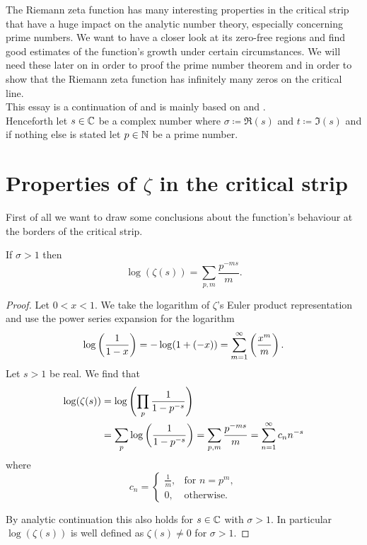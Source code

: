 The Riemann zeta function has many interesting properties in the critical strip that have a huge impact on the analytic number theory, especially concerning prime numbers. We want to have a closer look at its zero-free regions and find good estimates of the function's growth under certain circumstances. We will need these later on in order to proof the prime number theorem and in order to show that the Riemann zeta function has infinitely many zeros on the critical line. \\
This essay is a continuation of \cite{Jesacher2016} and is mainly based on \cite{Ahlfors1966} and \cite{Titchmarsh1986}. \\
Henceforth let $s \in \mathbb{C}$ be a complex number where $\sigma \coloneqq \Re(s)$ and $t \coloneqq \Im(s)$ and if nothing else is stated let $p \in \mathbb{N}$ be a prime number.


\section{Properties of $\zeta$ in the critical strip}
First of all we want to draw some conclusions about the function's behaviour at the borders of the critical strip.


\begin{lemma}\label{lem:LogEulerProd}
	If $\sigma > 1$ then
\begin{equation*}
	\log(\zeta(s)) = \sum _{p,m} \frac{p^{-ms}}{m}.
\end{equation*}
\end{lemma}
\begin{proof}
	Let $0 < x < 1$. We take the logarithm of $\zeta$'s Euler product representation and use the power series expansion for the logarithm
\begin{equation*}
	\log\left(\frac{1}{1 - x}\right) = -\log(1 + (-x)) = \sum _{m = 1} ^\infty \left(\frac{x^m}{m}\right).
\end{equation*}
	Let $s > 1$ be real. We find that
\begin{equation*}
\begin{aligned}	
	\log(\zeta(s)) 
		&= \log\left(\prod _p \frac{1}{1 - p^{-s}}\right) \\
		&= \sum _p \log\left(\frac{1}{1 - p^{-s}}\right)
		= \sum _{p,m} \frac{p^{-ms}}{m} = \sum _{n=1} ^{\infty} c_n n^{-s}
\end{aligned}
\end{equation*}
	where
\begin{equation*}
    c_n =
    \left\{
    	\begin{array}{ll}
        	\frac{1}{m}, & \text{for } n = p^m, \\
        	0, & \text{otherwise.}
        \end{array}
	\right.
\end{equation*}

	By analytic continuation this also holds for $s \in \mathbb{C}$ with $\sigma > 1$. In particular $\log(\zeta(s))$ is well defined as $\zeta(s) \neq 0$ for $\sigma > 1$.
\end{proof}


